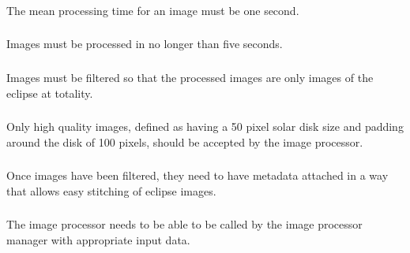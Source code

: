 \documentclass[10pt, onecolumn, draftclsnofoot, letterpaper, compsoc]{IEEEtran}
\begin{document}
\subsubsection{}

The mean processing time for an image must be one second. \\

\subsubsection{}

Images must be processed in no longer than five seconds.\\

\subsubsection{}

Images must be filtered so that the processed images are only images of the
eclipse at totality.\\

\subsubsection{}

Only high quality images, defined as having a 50 pixel solar disk size and
padding around the disk of 100 pixels, should be accepted by the image
processor.\\

\subsubsection{}

Once images have been filtered, they need to have metadata attached in a way
that allows easy stitching of eclipse images. \\

\subsubsection{}

The image processor needs to be able to be called by the image processor manager
with appropriate input data. \\

\subsubsection{}
\end{document}
